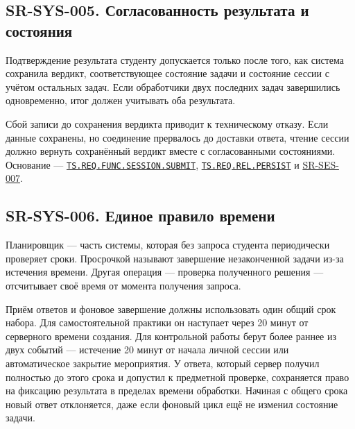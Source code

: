 \documentclass[12pt,a4paper]{article}
\begin{document}
\subsection{SR-SYS-005. Согласованность результата и состояния}\label{sr-sys-005-ux441ux43eux433ux43bux430ux441ux43eux432ux430ux43dux43dux43eux441ux442ux44c-ux440ux435ux437ux443ux43bux44cux442ux430ux442ux430-ux438-ux441ux43eux441ux442ux43eux44fux43dux438ux44f}

\hypertarget{sr-sys-005-согласованность-результата-и-состояния}{}

\hypertarget{sr-sys-005}{}

Подтверждение результата студенту допускается только после того, как система сохранила вердикт, соответствующее состояние задачи и состояние сессии с учётом остальных задач. Если обработчики двух последних задач завершились одновременно, итог должен учитывать оба результата.

Сбой записи до сохранения вердикта приводит к техническому отказу. Если данные сохранены, но соединение прервалось до доставки ответа, чтение сессии должно вернуть сохранённый вердикт вместе с согласованными состояниями. Основание --- {\href{../02\_Техническое\_задание/DOC-02\_Техническое\_задание.pdf\#ts-req-func-session-submit}{\texttt{TS.\allowbreak{}REQ.\allowbreak{}FUNC.\allowbreak{}SESSION.\allowbreak{}SUBMIT}}}, {\href{../02\_Техническое\_задание/DOC-02\_Техническое\_задание.pdf\#ts-req-rel-persist}{\texttt{TS.\allowbreak{}REQ.\allowbreak{}REL.\allowbreak{}PERSIST}}} и {\hyperlink{sr-ses-007}{SR-SES-007}}.

\subsection{SR-SYS-006. Единое правило времени}\label{sr-sys-006-ux435ux434ux438ux43dux43eux435-ux43fux440ux430ux432ux438ux43bux43e-ux432ux440ux435ux43cux435ux43dux438}

\hypertarget{sr-sys-006-единое-правило-времени}{}

\hypertarget{sr-sys-006}{}

Планировщик --- часть системы, которая без запроса студента периодически проверяет сроки. Просрочкой называют завершение незаконченной задачи из-за истечения времени. Другая операция --- проверка полученного решения --- отсчитывает своё время от момента получения запроса.

Приём ответов и фоновое завершение должны использовать один общий срок набора. Для самостоятельной практики он наступает через 20 минут от серверного времени создания. Для контрольной работы берут более раннее из двух событий --- истечение 20 минут от начала личной сессии или автоматическое закрытие мероприятия. У ответа, который сервер получил полностью до этого срока и допустил к предметной проверке, сохраняется право на фиксацию результата в пределах времени обработки. Начиная с общего срока новый ответ отклоняется, даже если фоновый цикл ещё не изменил состояние задачи.
\end{document}
